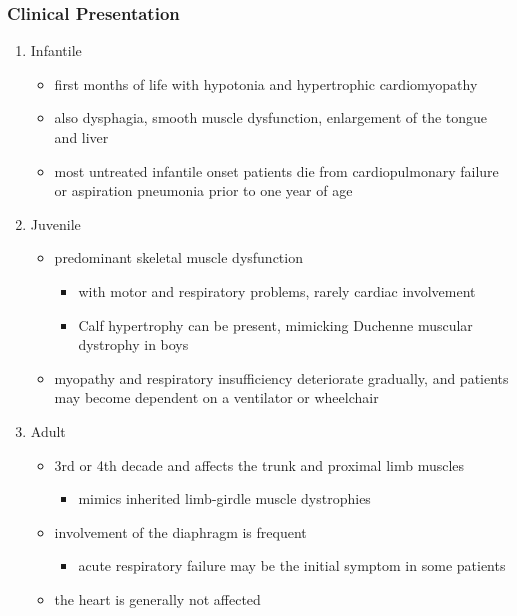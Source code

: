 \documentclass{scrartcl}
\begin{document}
\subsubsection{Clinical Presentation}
\label{sec:org1ea5112}
\begin{enumerate}
\item Infantile
\label{sec:org27a82f0}
\begin{itemize}
\item first months of life with hypotonia and hypertrophic cardiomyopathy
\item also dysphagia, smooth muscle dysfunction, enlargement of the tongue
and liver
\item most untreated infantile onset patients die from cardiopulmonary
failure or aspiration pneumonia prior to one year of age
\end{itemize}
\item Juvenile
\label{sec:orgaad5677}
\begin{itemize}
\item predominant skeletal muscle dysfunction
\begin{itemize}
\item with motor and respiratory problems, rarely cardiac involvement
\item Calf hypertrophy can be present, mimicking Duchenne muscular dystrophy in boys
\end{itemize}
\item myopathy and respiratory insufficiency deteriorate gradually, and patients may become dependent on a ventilator or wheelchair
\end{itemize}
\item Adult
\label{sec:org9cfbfd0}
\begin{itemize}
\item 3rd or 4th decade and affects the trunk and proximal limb muscles
\begin{itemize}
\item mimics inherited limb-girdle muscle dystrophies
\end{itemize}
\item involvement of the diaphragm is frequent
\begin{itemize}
\item acute respiratory failure may be the initial symptom in some patients
\end{itemize}
\item the heart is generally not affected
\end{itemize}
\end{enumerate}
\end{document}
